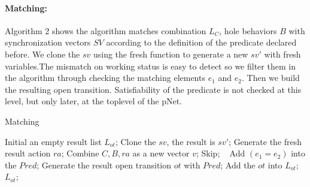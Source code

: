 \documentclass{lncs/llncs}
\begin{document}
\paragraph{Matching:} Algorithm 2 shows the algorithm matches
combination $L_C$, hole behaviors $B$ with synchronization vectors
$SV$ according to the definition of the predicate declared before. We
clone the $sv$ using the fresh function to generate a new $sv'$ with
fresh variables.The mismatch on working status is easy to detect so we
filter them in the algorithm through checking the matching elements
$e_1$ and $e_2$. 
Then we build the resulting open transition. Satisfiability of the
predicate is not checked at this level, but only later, at the
toplevel of the pNet.

\begin{algorithm}
\caption{Matching}
\begin{algorithmic}[1]

\State Initial an empty result list $L_{ot}$;
		\State Clone the $sv$, the result is $sv'$;
		\State Generate the fresh result action $ra$;
		\State Combine $C, B, ra$ as a new vector $v$;
			\State Skip;
			\Else ~ Add $(e_1 = e_2)$ into the $Pred$;
			\EndIf
		\EndFor
		\State Generate the result open transition $ot$ with $Pred$;
		\State Add the $ot$ into $L_{ot}$;
	\EndFor
\EndFor 
\State \Return $L_{ot}$;

\end{algorithmic} 
\end{algorithm}
\end{document}
